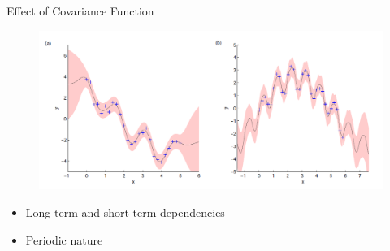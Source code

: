 \begin{frame}{Effect of Covariance Function}
    \begin{figure}
        \includegraphics[width=1\linewidth]{figures/choose_covariance_function}
    \end{figure}
    \begin{itemize}
        \item Long term and short term dependencies
        \item Periodic nature
    \end{itemize}
\end{frame}
